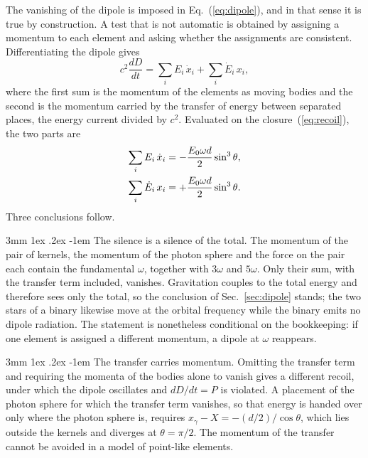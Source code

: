 \documentclass[%
 reprint, amsmath,amssymb, aps, prb, ]{revtex4-2}
\makeatletter
\numberwithin{equation}{section}
\renewcommand\paragraph{%
  \@startsection{paragraph}{4}{\z@}%
    {3mm \@plus 1ex \@minus .2ex}%
    {-1em}%
    {\normalfont\normalsize\itshape}}
\makeatother
\begin{document}
The vanishing of the dipole is imposed in Eq.~(\ref{eq:dipole}), and in that sense it is true by construction. A test that is not automatic is obtained by assigning a momentum to each element and asking whether the assignments are consistent. Differentiating the dipole gives
\begin{equation}
c^2\frac{dD}{dt} = \sum_i E_i\,\dot x_i + \sum_i \dot E_i\,x_i ,
\label{eq:bookkeeping}
\end{equation}
where the first sum is the momentum of the elements as moving bodies and the second is the momentum carried by the transfer of energy between separated places, the energy current divided by $c^2$. Evaluated on the closure~(\ref{eq:recoil}), the two parts are
\begin{align}
\sum_i E_i\,\dot x_i &= -\frac{E_0\omega d}{2}\sin^3\theta,
\notag\\
\sum_i \dot E_i\,x_i &= +\frac{E_0\omega d}{2}\sin^3\theta .
\label{eq:twoparts}
\end{align}
Three conclusions follow.

\paragraph{The silence is a silence of the total.} The momentum of the pair of kernels, the momentum of the photon sphere and the force on the pair each contain the fundamental $\omega$, together with $3\omega$ and $5\omega$. Only their sum, with the transfer term included, vanishes. Gravitation couples to the total energy and therefore sees only the total, so the conclusion of Sec.~\ref{sec:dipole} stands; the two stars of a binary likewise move at the orbital frequency while the binary emits no dipole radiation. The statement is nonetheless conditional on the bookkeeping: if one element is assigned a different momentum, a dipole at $\omega$ reappears.

\paragraph{The transfer carries momentum.} Omitting the transfer term and requiring the momenta of the bodies alone to vanish gives a different recoil, under which the dipole oscillates and $dD/dt = P$ is violated. A placement of the photon sphere for which the transfer term vanishes, so that energy is handed over only where the photon sphere is, requires $x_\gamma - X = -(d/2)/\cos\theta$, which lies outside the kernels and diverges at $\theta = \pi/2$. The momentum of the transfer cannot be avoided in a model of point-like elements.
\end{document}
